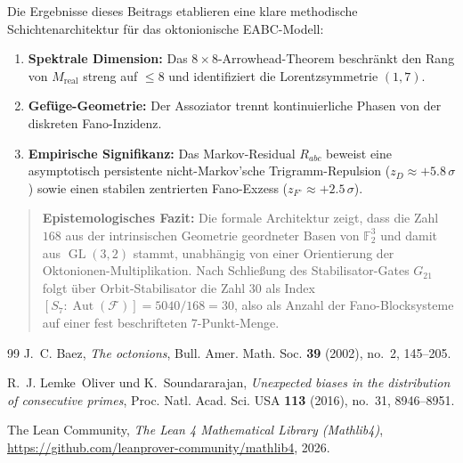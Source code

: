 \documentclass[11pt,a4paper]{article}
\theoremstyle{remark}
\begin{document}
	Die Ergebnisse dieses Beitrags etablieren eine klare methodische Schichtenarchitektur für das oktonionische EABC-Modell:
	\begin{enumerate}
		\item \textbf{Spektrale Dimension:} Das $8 \times 8$-Arrowhead-Theorem beschränkt den Rang von $M_{\mathrm{real}}$ streng auf $\le 8$ und identifiziert die Lorentzsymmetrie $(1,7)$.
		\item \textbf{Gefüge-Geometrie:} Der Assoziator trennt kontinuierliche Phasen von der diskreten Fano-Inzidenz.
		\item \textbf{Empirische Signifikanz:} Das Markov-Residual $R_{abc}$ beweist eine asymptotisch persistente nicht-Markov'sche Trigramm-Repulsion ($z_D \approx +5.8\,\sigma$) sowie einen stabilen zentrierten Fano-Exzess ($z_{F^\circ} \approx +2.5\,\sigma$).
	\end{enumerate}
	
	\begin{quote}
		\textbf{Epistemologisches Fazit:} Die formale Architektur zeigt, dass die Zahl $168$ aus der intrinsischen Geometrie geordneter Basen von $\mathbb{F}_2^3$ und damit aus $\operatorname{GL}(3,2)$ stammt, unabhängig von einer Orientierung der Oktonionen-Multiplikation. Nach Schließung des Stabilisator-Gates $G_{21}$ folgt über Orbit-Stabilisator die Zahl $30$ als Index $[S_7 : \operatorname{Aut}(\mathcal{F})] = 5040 / 168 = 30$, also als Anzahl der Fano-Blocksysteme auf einer fest beschrifteten $7$-Punkt-Menge.
	\end{quote}
	
	\begin{thebibliography}{99}
		J.~C. Baez, \emph{The octonions}, Bull. Amer. Math. Soc. \textbf{39} (2002), no.~2, 145--205.
		
		R.~J. Lemke~Oliver und K.~Soundararajan, \emph{Unexpected biases in the distribution of consecutive primes}, Proc. Natl. Acad. Sci. USA \textbf{113} (2016), no.~31, 8946--8951.
		
		The Lean Community, \emph{The Lean 4 Mathematical Library (Mathlib4)}, \url{https://github.com/leanprover-community/mathlib4}, 2026.
	\end{thebibliography}
	
\end{document}
